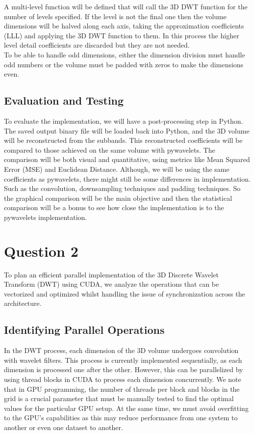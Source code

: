 \documentclass{article}
\begin{document}
A multi-level function will be defined that will call the 3D DWT function for the number of levels specified. If the level is not the final one then the volume dimensions will be halved along each axis, taking the approximation coefficients (LLL) and applying the 3D DWT function to them. In this process the higher level detail coefficients are discarded but they are not needed.\\
 
To be able to handle odd dimensions, either the dimension division must handle odd numbers or the volume must be padded with zeros to make the dimensions even.\\

\subsection{Evaluation and Testing}
To evaluate the implementation, we will have a post-processing step in Python. The saved output binary file will be loaded back into Python, and the 3D volume will be reconstructed from the subbands. This reconstructed coefficients will be compared to those achieved on the same volume with pywavelets. The comparison will be both visual and quantitative, using metrics like Mean Squared Error (MSE) and Euclidean Distance. Although, we will be using the same coefficients as pywavelets, there might still be some differences in implementation. Such as the convolution, downsampling techniques and padding techniques. So the graphical comparison will be the main objective and then the statistical comparison will be a bonus to see how close the implementation is to the pywavelets implementation.\\

\pagebreak

\section{Question 2}
To plan an efficient parallel implementation of the 3D Discrete Wavelet Transform (DWT) using CUDA, we analyze the operations that can be vectorized and optimized whilst handling the issue of synchronization across the architecture.

\subsection{Identifying Parallel Operations}
In the DWT process, each dimension of the 3D volume undergoes convolution with wavelet filters. This process is currently implemented sequentially, as each dimension is processed one after the other. However, this can be parallelized by using thread blocks in CUDA to process each dimension concurrently. We note that in GPU programming, the number of threads per block and blocks in the grid is a crucial parameter that must be manually tested to find the optimal values for the particular GPU setup. At the same time, we must avoid overfitting to the GPU's capabilities as this may reduce performance from one system to another or even one dataset to another.\\
\end{document}

